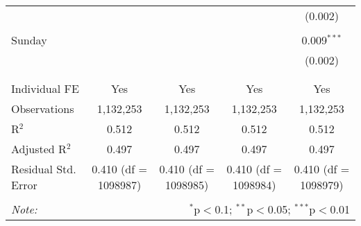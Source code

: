 \documentclass[
]{article}
\begin{document}
\begin{table}[!htbp]
{\begin{tabular}{@{\extracolsep{5pt}}lcccc}
  &  &  &  & (0.002) \\ 
  & & & & \\ 
 Sunday &  &  &  & 0.009$^{***}$ \\ 
  &  &  &  & (0.002) \\ 
  & & & & \\ 
\hline \\[-1.8ex] 
Individual FE & Yes & Yes & Yes & Yes \\ 
Observations & 1,132,253 & 1,132,253 & 1,132,253 & 1,132,253 \\ 
R$^{2}$ & 0.512 & 0.512 & 0.512 & 0.512 \\ 
Adjusted R$^{2}$ & 0.497 & 0.497 & 0.497 & 0.497 \\ 
Residual Std. Error & 0.410 (df = 1098987) & 0.410 (df = 1098985) & 0.410 (df = 1098984) & 0.410 (df = 1098979) \\ 
\hline 
\hline \\[-1.8ex] 
\textit{Note:}  & \multicolumn{4}{r}{$^{*}$p$<$0.1; $^{**}$p$<$0.05; $^{***}$p$<$0.01} \\ 
\end{tabular}
} 
\end{table} 
\newpage
\end{document}
